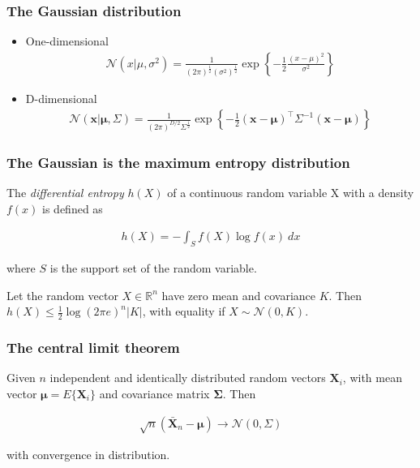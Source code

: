 \begin{frame}
\frametitle{The Gaussian distribution}

    \begin{itemize}
        \item One-dimensional
        \begin{align*}
            \mathcal{N}(x|\mu,\sigma^2)=\frac{1}{(2\pi)^\frac{1}{2}(\sigma^2)^\frac{1}{2}}\exp\left\{-\frac{1}{2}\frac{(x-\mu)^2}{\sigma^2}\right\}
        \end{align*}
        \item D-dimensional
        \begin{align*}
            \mathcal{N}(\mathbf{x}|\boldsymbol{\mu},\Sigma)=\frac{1}{(2\pi)^{D/2}\Sigma^{\frac{1}{2}}}\exp\left\{-\frac{1}{2}(\mathbf{x}-\boldsymbol{\mu})^\intercal\Sigma^{-1}(\mathbf{x}-\boldsymbol{\mu})\right\}
        \end{align*}
    \end{itemize}

\end{frame}

\begin{frame}
    \frametitle{The Gaussian is the maximum entropy distribution
    \citep{coverAndThomas91}}

    \begin{probDef}
        The \textit{differential entropy} $h(X)$ of a continuous random
        variable X with a density $f(x)$ is defined as

        \begin{align*}
            h(X)=-\int_Sf(X)\log f(x)\ dx
        \end{align*}

        where $S$ is the support set of the random variable.
    \end{probDef}

    \begin{theorem}
        Let the random vector $X\in\mathbb{R}^n$ have zero mean and covariance
        $K$. Then $h(X)\le\frac{1}{2}\log(2\pi e)^n|K|$, with equality if
        $X\sim\mathcal{N}(0,K)$.
    \end{theorem}

\end{frame}

\begin{frame}
    \frametitle{The central limit theorem \citep{papoulisAndPillai02}}

	\begin{theorem}
		Given $n$ independent and identically distributed random vectors $\mathbf{X}_i$, with mean vector $\boldsymbol{\mu}=E\{\mathbf{X}_i\}$ and covariance matrix $\mathbf{\Sigma}$. Then

		\begin{align*}
			\sqrt{n}(\bar{\mathbf{X}}_n-\boldsymbol{\mu})\rightarrow\mathcal{N}(0,\Sigma)
		\end{align*}

		with convergence in distribution.
	\end{theorem}
\end{frame}

